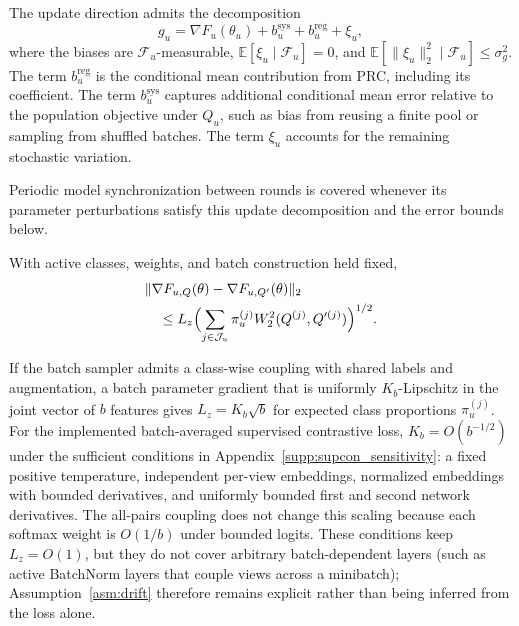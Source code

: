 \begin{assumption}
\label{asm:variance}
The update direction admits the decomposition
\begin{equation}
 g_u=\nabla F_u(\theta_u)
 +b_u^{\mathrm{sys}}+b_u^{\mathrm{reg}}+\xi_u,
 \label{eq:gradient_model}
\end{equation}
where the biases are $\mathcal F_u$-measurable,
$\mathbb E[\xi_u\mid\mathcal F_u]=0$, and
$\mathbb E[\|\xi_u\|_2^2\mid\mathcal F_u]\le\sigma_g^2$.
The term $b_u^{\mathrm{reg}}$ is the conditional mean contribution from PRC, including its coefficient. The term $b_u^{\mathrm{sys}}$ captures additional conditional mean error relative to the population objective under $Q_u$, such as bias from reusing a finite pool or sampling from shuffled batches. The term $\xi_u$ accounts for the remaining stochastic variation.
\end{assumption}
Periodic model synchronization between rounds is covered whenever its parameter perturbations satisfy this update decomposition and the error bounds below.

\begin{assumption}
\label{asm:drift}
With active classes, weights, and batch construction held fixed,
\begin{equation}
\begin{split}
 &\|\nabla F_{u,Q}(\theta)-\nabla F_{u,Q'}(\theta)\|_2\\
 &\quad\le L_z\Bigl(
 \sum_{j\in\mathcal J_u}\pi_u^{(j)}
 W_2^2(Q^{(j)},Q'^{(j)})\Bigr)^{1/2}.
\end{split}
\label{eq:gradient_distribution_sensitivity}
\end{equation}
\end{assumption}

If the batch sampler admits a class-wise coupling with shared labels and augmentation, a batch parameter gradient that is uniformly $K_b$-Lipschitz in the joint vector of $b$ features gives $L_z=K_b\sqrt b$ for expected class proportions $\pi_u^{(j)}$. For the implemented batch-averaged supervised contrastive loss, $K_b=O(b^{-1/2})$ under the sufficient conditions in Appendix~\ref{supp:supcon_sensitivity}: a fixed positive temperature, independent per-view embeddings, normalized embeddings with bounded derivatives, and uniformly bounded first and second network derivatives. The all-pairs coupling does not change this scaling because each softmax weight is $O(1/b)$ under bounded logits. These conditions keep $L_z=O(1)$, but they do not cover arbitrary batch-dependent layers (such as active BatchNorm layers that couple views across a minibatch); Assumption~\ref{asm:drift} therefore remains explicit rather than being inferred from the loss alone.


